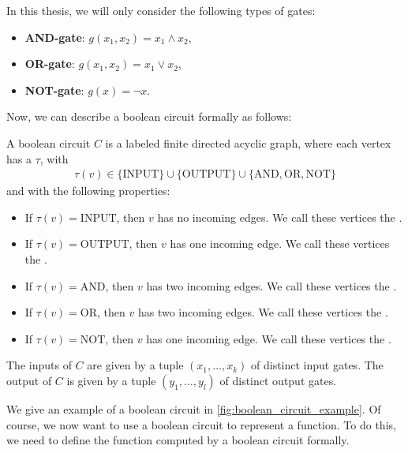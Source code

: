 In this thesis, we will only consider the following types of gates:
\begin{itemize}
	\item \textbf{AND-gate}: $g(x_1, x_2) = x_1 \land x_2$,
	\item \textbf{OR-gate}: $g(x_1, x_2) = x_1 \lor x_2$,
	\item \textbf{NOT-gate}: $g(x) = \lnot x$.
\end{itemize}

Now, we can describe a boolean circuit formally as follows:
\begin{definition}
	A boolean circuit $C$ is a labeled finite directed acyclic graph, where each vertex has a  $\tau$, with
	\begin{align*}
		\tau(v) \in \{\text{INPUT}\} \cup \{\text{OUTPUT}\} \cup \{\text{AND}, \text{OR}, \text{NOT}\}
	\end{align*}
	and with the following properties:
	\begin{itemize}
		\item If $\tau(v) = \text{INPUT}$, then $v$ has no incoming edges. We call these vertices the .
		\item If $\tau(v) = \text{OUTPUT}$, then $v$ has one incoming edge. We call these vertices the .
		\item If $\tau(v) = \text{AND}$, then $v$ has two incoming edges. We call these vertices the .
		\item If $\tau(v) = \text{OR}$, then $v$ has two incoming edges. We call these vertices the .
		\item If $\tau(v) = \text{NOT}$, then $v$ has one incoming edge. We call these vertices the .
	\end{itemize}
	The inputs of $C$ are given by a tuple $(x_1, \dots, x_k)$ of distinct input gates. The output of $C$ is given by a tuple $(y_1, \dots, y_l)$ of distinct output gates.
\end{definition}

We give an example of a boolean circuit in \cref{fig:boolean_circuit_example}. Of course, we now want to use a boolean circuit to represent a function. To do this, we need to define the function computed by a boolean circuit formally.

